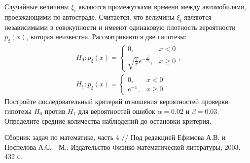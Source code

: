 \documentclass[a4paper,12pt]{article}
\begin{document}
Случайные величины $\xi_i$ являются промежутками времени между автомобилями, проезжающими по автостраде. Считается, что величины $\xi_i$ являются
независимыми в совокупности и имееют одинаковую плотность вероятности $p_\xi(x)$, которая неизвестна. Рассматриваются две гипотезы:
\begin{gather*}
    H_0:
    p_\xi(x) = \left \{
    \begin{array}{ll}
        0,                                       & x < 0   \\
        \sqrt{\frac{2}{\pi}} e^{-\frac{x^2}{2}}, & x \ge 0
    \end{array}
    \right . , \\
    H_1:
    p_\xi(x) = \left \{
    \begin{array}{ll}
        0,      & x < 0   \\
        e^{-x}, & x \ge 0
    \end{array}
    \right . .
\end{gather*}
Постройте последовательный критерий отношения вероятностей проверки гипотезы $H_0$ против $H_1$ для вероятностей ошибок $\alpha = 0.02$ и $\beta = 0.03$.
Определите средние количества наблюдений до остановки критерия.

\begin{thebibliography}{1}
     Сборник задач по математике, часть 4 // Под редакцией Ефимова А.В. и Поспелова А.С. - М.: Издательство Физико-математической
    литературы, 2003. - 432 с.
\end{thebibliography}
\end{document}
